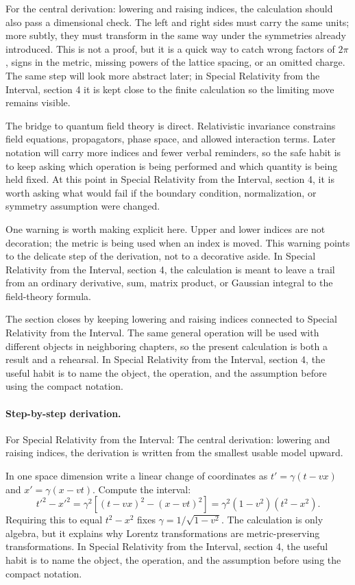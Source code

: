 For the central derivation: lowering and raising indices, the calculation should also pass a dimensional check.  The left and right sides must carry the same units; more subtly, they must transform in the same way under the symmetries already introduced.  This is not a proof, but it is a quick way to catch wrong factors of \(2\pi\), signs in the metric, missing powers of the lattice spacing, or an omitted charge.  The same step will look more abstract later; in Special Relativity from the Interval, section 4 it is kept close to the finite calculation so the limiting move remains visible.

The bridge to quantum field theory is direct.  Relativistic invariance constrains field equations, propagators, phase space, and allowed interaction terms.  Later notation will carry more indices and fewer verbal reminders, so the safe habit is to keep asking which operation is being performed and which quantity is being held fixed.  At this point in Special Relativity from the Interval, section 4, it is worth asking what would fail if the boundary condition, normalization, or symmetry assumption were changed.

One warning is worth making explicit here.  Upper and lower indices are not decoration; the metric is being used when an index is moved.  This warning points to the delicate step of the derivation, not to a decorative aside.  In Special Relativity from the Interval, section 4, the calculation is meant to leave a trail from an ordinary derivative, sum, matrix product, or Gaussian integral to the field-theory formula.

The section closes by keeping lowering and raising indices connected to Special Relativity from the Interval.  The same general operation will be used with different objects in neighboring chapters, so the present calculation is both a result and a rehearsal.  In Special Relativity from the Interval, section 4, the useful habit is to name the object, the operation, and the assumption before using the compact notation.



\paragraph{Step-by-step derivation.}

For Special Relativity from the Interval: The central derivation: lowering and raising indices, the derivation is written from the smallest usable model upward.

In one space dimension write a linear change of coordinates as \(t'=\gamma(t-vx)\) and \(x'=\gamma(x-vt)\).  Compute the interval:
\[
  t'^2-x'^2
  =
  \gamma^2[(t-vx)^2-(x-vt)^2]
  =
  \gamma^2(1-v^2)(t^2-x^2).
\]
Requiring this to equal \(t^2-x^2\) fixes \(\gamma=1/\sqrt{1-v^2}\).  The calculation is only algebra, but it explains why Lorentz transformations are metric-preserving transformations.  In Special Relativity from the Interval, section 4, the useful habit is to name the object, the operation, and the assumption before using the compact notation.

